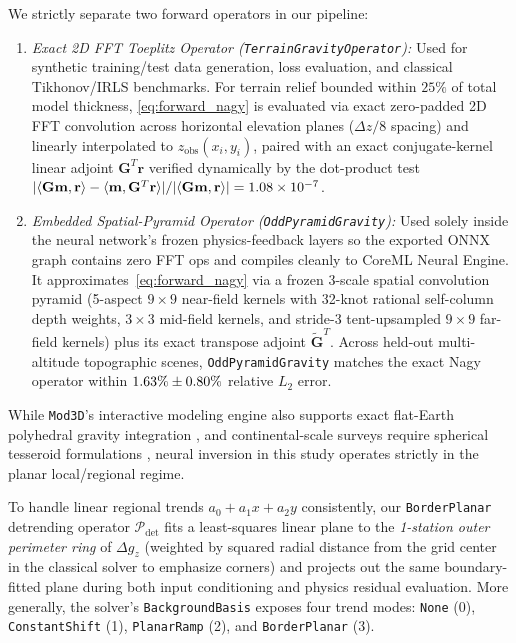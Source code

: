 \documentclass[11pt,a4paper]{article}
\begin{document}
We strictly separate two forward operators in our pipeline:
\begin{enumerate}[leftmargin=1.4em,itemsep=0.2em]
  \item \emph{Exact 2D FFT Toeplitz Operator (\texttt{TerrainGravityOperator}):} Used for synthetic training/test data generation, loss evaluation, and classical Tikhonov/IRLS benchmarks. For terrain relief bounded within $25\%$ of total model thickness, \eqref{eq:forward_nagy} is evaluated via exact zero-padded 2D FFT convolution across horizontal elevation planes ($\Delta z / 8$ spacing) and linearly interpolated to $z_{\mathrm{obs}}(x_i,y_i)$, paired with an exact conjugate-kernel linear adjoint $\mathbf{G}^T\mathbf{r}$ verified dynamically by the dot-product test $|\langle\mathbf{G}\mathbf{m},\mathbf{r}\rangle - \langle\mathbf{m},\mathbf{G}^T\mathbf{r}\rangle|/|\langle\mathbf{G}\mathbf{m},\mathbf{r}\rangle| = 1.08 \times 10^{-7}{}$.
  \item \emph{Embedded Spatial-Pyramid Operator (\texttt{OddPyramidGravity}):} Used solely inside the neural network's frozen physics-feedback layers so the exported ONNX graph contains zero FFT ops and compiles cleanly to CoreML Neural Engine. It approximates~\eqref{eq:forward_nagy} via a frozen 3-scale spatial convolution pyramid (5-aspect $9\times 9$ near-field kernels with 32-knot rational self-column depth weights, $3\times 3$ mid-field kernels, and stride-3 tent-upsampled $9\times 9$ far-field kernels) plus its exact transpose adjoint $\tilde{\mathbf{G}}^T$. Across held-out multi-altitude topographic scenes, \texttt{OddPyramidGravity} matches the exact Nagy operator within $1.63{}\% \pm 0.80{}\%$ relative $L_2$ error.
\end{enumerate}
While \texttt{Mod3D}'s interactive modeling engine also supports exact flat-Earth polyhedral gravity integration \citep{pohanka1988,pohanka1998}, and continental-scale surveys require spherical tesseroid formulations \citep{uieda2016}, neural inversion in this study operates strictly in the planar local/regional regime.

To handle linear regional trends $a_0 + a_1 x + a_2 y$ consistently, our \texttt{BorderPlanar} detrending operator $\mathcal{P}_{\mathrm{det}}$ fits a least-squares linear plane to the \emph{1-station outer perimeter ring} of $\Delta g_z$ (weighted by squared radial distance from the grid center in the classical solver to emphasize corners) and projects out the same boundary-fitted plane during both input conditioning and physics residual evaluation. More generally, the solver's \texttt{BackgroundBasis} exposes four trend modes: \texttt{None} (0), \texttt{ConstantShift} (1), \texttt{PlanarRamp} (2), and \texttt{BorderPlanar} (3).
\end{document}
